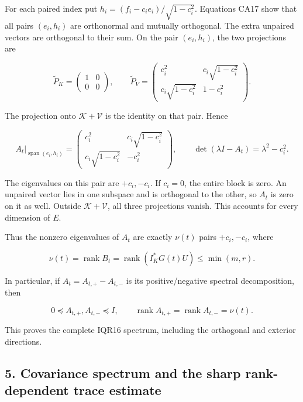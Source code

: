 For each paired index put \(h_i=(f_i-c_ie_i)/\sqrt{1-c_i^2}\). Equations CA17 show that all pairs \((e_i,h_i)\) are orthonormal and mutually orthogonal. The extra unpaired vectors are orthogonal to their sum. On the pair \((e_i,h_i)\), the two projections are

\[
\widetilde P_K=\begin{pmatrix}1&0\\0&0\end{pmatrix},
\qquad
\widetilde P_V=\begin{pmatrix}c_i^2&c_i\sqrt{1-c_i^2}\\
c_i\sqrt{1-c_i^2}&1-c_i^2\end{pmatrix}.
\]

The projection onto \(\mathcal K+\mathcal V\) is the identity on that pair. Hence

\[
A_t\big|_{\operatorname{span}(e_i,h_i)}
=\begin{pmatrix}c_i^2&c_i\sqrt{1-c_i^2}\\
c_i\sqrt{1-c_i^2}&-c_i^2\end{pmatrix},
\qquad \det(\lambda I-A_t)=\lambda^2-c_i^2.
\tag{CA18}
\]

The eigenvalues on this pair are \(+c_i,-c_i\). If \(c_i=0\), the entire block is zero. An unpaired vector lies in one subspace and is orthogonal to the other, so \(A_t\) is zero on it as well. Outside \(\mathcal K+\mathcal V\), all three projections vanish. This accounts for every dimension of \(E\).

Thus the nonzero eigenvalues of \(A_t\) are exactly \(\nu(t)\) pairs \(+c_i,-c_i\), where

\[
\nu(t)=\operatorname{rank}B_t
=\operatorname{rank}(I_K^*G(t)U)\le\min(m,r).
\tag{CA19}
\]

In particular, if \(A_t=A_{t,+}-A_{t,-}\) is its positive/negative spectral decomposition, then

\[
0\preceq A_{t,+},A_{t,-}\preceq I,
\qquad
\operatorname{rank}A_{t,+}=\operatorname{rank}A_{t,-}=\nu(t).
\tag{CA20}
\]

This proves the complete IQR16 spectrum, including the orthogonal and exterior directions.

\subsection{5. Covariance spectrum and the sharp rank-dependent trace estimate}\label{covariance-spectrum-and-the-sharp-rank-dependent-trace-estimate}

